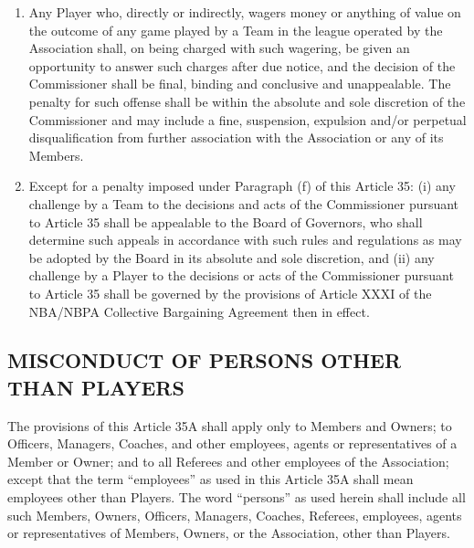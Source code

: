 \documentclass[]{book}
\begin{document}
\begin{enumerate}
\item
  Any Player who, directly or indirectly, wagers money or anything of value on the outcome of any game played by a Team in the league operated by the Association shall, on being charged with such wagering, be given an opportunity to answer such charges after due notice, and the decision of the Commissioner shall be final, binding and conclusive and unappealable. The penalty for such offense shall be within the absolute and sole discretion of the Commissioner and may include a fine, suspension, expulsion and/or perpetual disqualification from further association with the Association or any of its Members.
\item
  Except for a penalty imposed under Paragraph (f) of this Article 35: (i) any challenge by a Team to the decisions and acts of the Commissioner pursuant to Article 35 shall be appealable to the Board of Governors, who shall determine such appeals in accordance with such rules and regulations as may be adopted by the Board in its absolute and sole discretion, and (ii) any challenge by a Player to the decisions or acts of the Commissioner pursuant to Article 35 shall be governed by the provisions of Article XXXI of the NBA/NBPA Collective Bargaining Agreement then in effect.
\end{enumerate}

\hypertarget{misconduct-of-persons-other-than-players}{%
\subsection{MISCONDUCT OF PERSONS OTHER THAN PLAYERS}\label{misconduct-of-persons-other-than-players}}

The provisions of this Article 35A shall apply only to Members and Owners; to Officers, Managers, Coaches, and other employees, agents or representatives of a Member or Owner; and to all Referees and other employees of the Association; except that the term ``employees'' as used in this Article 35A shall mean employees other than Players. The word ``persons'' as used herein shall include all such Members, Owners, Officers, Managers, Coaches, Referees, employees, agents or representatives of Members, Owners, or the Association, other than Players.
\end{document}
